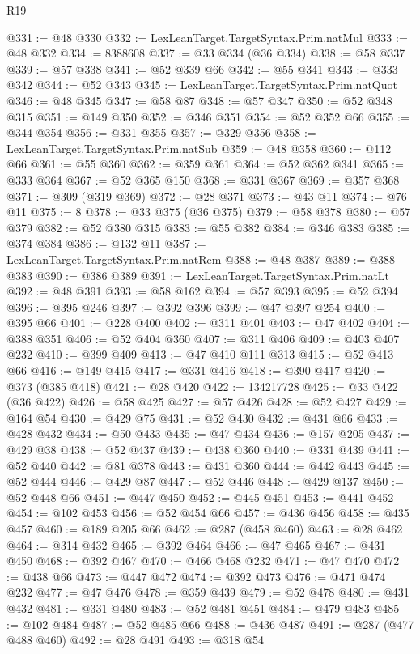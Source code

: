 \begin{lexlean}{R19}
\begin{coremodule}
@331 := @48 @330
@332 := LexLeanTarget.TargetSyntax.Prim.natMul
@333 := @48 @332
@334 := 8388608
@337 := @33 @334 (@36 @334)
@338 := @58 @337
@339 := @57 @338
@341 := @52 @339 @66
@342 := @55 @341
@343 := @333 @342
@344 := @52 @343
@345 := LexLeanTarget.TargetSyntax.Prim.natQuot
@346 := @48 @345
@347 := @58 @87
@348 := @57 @347
@350 := @52 @348 @315
@351 := @149 @350
@352 := @346 @351
@354 := @52 @352 @66
@355 := @344 @354
@356 := @331 @355
@357 := @329 @356
@358 := LexLeanTarget.TargetSyntax.Prim.natSub
@359 := @48 @358
@360 := @112 @66
@361 := @55 @360
@362 := @359 @361
@364 := @52 @362 @341
@365 := @333 @364
@367 := @52 @365 @150
@368 := @331 @367
@369 := @357 @368
@371 := @309 (@319 @369)
@372 := @28 @371
@373 := @43 @11
@374 := @76 @11
@375 := 8
@378 := @33 @375 (@36 @375)
@379 := @58 @378
@380 := @57 @379
@382 := @52 @380 @315
@383 := @55 @382
@384 := @346 @383
@385 := @374 @384
@386 := @132 @11
@387 := LexLeanTarget.TargetSyntax.Prim.natRem
@388 := @48 @387
@389 := @388 @383
@390 := @386 @389
@391 := LexLeanTarget.TargetSyntax.Prim.natLt
@392 := @48 @391
@393 := @58 @162
@394 := @57 @393
@395 := @52 @394
@396 := @395 @246
@397 := @392 @396
@399 := @47 @397 @254
@400 := @395 @66
@401 := @228 @400
@402 := @311 @401
@403 := @47 @402
@404 := @388 @351
@406 := @52 @404 @360
@407 := @311 @406
@409 := @403 @407 @232
@410 := @399 @409
@413 := @47 @410 @111 @313
@415 := @52 @413 @66
@416 := @149 @415
@417 := @331 @416
@418 := @390 @417
@420 := @373 (@385 @418)
@421 := @28 @420
@422 := 134217728
@425 := @33 @422 (@36 @422)
@426 := @58 @425
@427 := @57 @426
@428 := @52 @427
@429 := @164 @54
@430 := @429 @75
@431 := @52 @430
@432 := @431 @66
@433 := @428 @432
@434 := @50 @433
@435 := @47 @434
@436 := @157 @205
@437 := @429 @38
@438 := @52 @437
@439 := @438 @360
@440 := @331 @439
@441 := @52 @440
@442 := @81 @378
@443 := @431 @360
@444 := @442 @443
@445 := @52 @444
@446 := @429 @87
@447 := @52 @446
@448 := @429 @137
@450 := @52 @448 @66
@451 := @447 @450
@452 := @445 @451
@453 := @441 @452
@454 := @102 @453
@456 := @52 @454 @66
@457 := @436 @456
@458 := @435 @457
@460 := @189 @205 @66
@462 := @287 (@458 @460)
@463 := @28 @462
@464 := @314 @432
@465 := @392 @464
@466 := @47 @465
@467 := @431 @450
@468 := @392 @467
@470 := @466 @468 @232
@471 := @47 @470
@472 := @438 @66
@473 := @447 @472
@474 := @392 @473
@476 := @471 @474 @232
@477 := @47 @476
@478 := @359 @439
@479 := @52 @478
@480 := @431 @432
@481 := @331 @480
@483 := @52 @481 @451
@484 := @479 @483
@485 := @102 @484
@487 := @52 @485 @66
@488 := @436 @487
@491 := @287 (@477 @488 @460)
@492 := @28 @491
@493 := @318 @54

\end{coremodule}
\end{lexlean}

